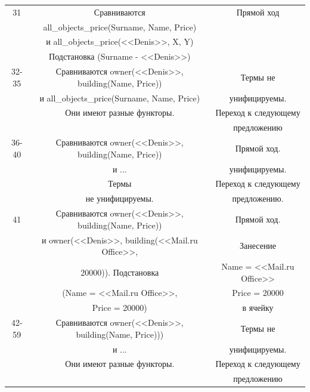 \documentclass[12pt]{report}
\begin{document}
\begin{table}[H]
\begin{center}
\begin{tabular}{|c c c |}
			\hline
			31 & Сравниваются & Прямой ход \\
			  & all\_objects\_price(Surname, Name, Price) & \\
			  & и all\_objects\_price(<<Denis>>, X, Y)  & \\
			  & Подстановка (Surname - <<Denis>>) &\\
			\hline
			32-35 & Сравниваются owner(<<Denis>>, building(Name, Price)) & Термы не \\
			  & и all\_objects\_price(Surname, Name, Price) & унифицируемы. \\
			  & Они имеют разные функторы. &Переход к следующему \\
			  & & предложению\\		
			\hline
			36-40 & Сравниваются  owner(<<Denis>>, building(Name, Price)) & Прямой ход. \\
			  & и ... & унифицируемы. \\
		      &  Термы   & Переход к следующему \\
			  & не унифицируемы. & предложению. \\
			\hline
			41 & Сравниваются owner(<<Denis>>, building(Name, Price)) & Прямой ход. \\
			  & и owner(<<Denis>>, building(<<Mail.ru Office>>, & Занесение \\
			  &  20000)). Подстановка & Name = <<Mail.ru Office>> \\
			  & (Name = <<Mail.ru Office>>, & Price = 20000\\
			  & Price = 20000) & в ячейку\\

			\hline
			42-59 & Сравниваются owner(<<Denis>>, building(Name, Price))) & Термы не \\
			  & и ... & унифицируемы. \\
			  & Они имеют разные функторы. &Переход к следующему \\
			  & & предложению\\
\hline
\end{tabular}
	\end{center}
\end{table}
\end{document}
